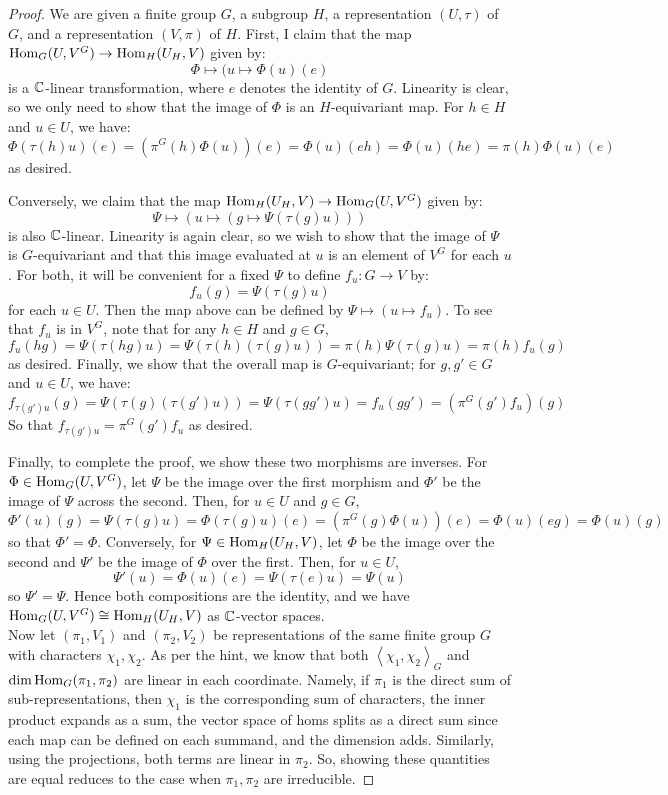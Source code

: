 \begin{proof}
	We are given a finite group $G$, a subgroup $H$, a representation $(U,\tau)$ of $G$, and a representation $(V,\pi)$ of $H$. First, I claim that the map $\operatorname{Hom}_G(U,V^G) \to \operatorname{Hom}_H(U_H,V)$ given by:
	\[ \Phi \mapsto (u \mapsto \Phi(u)(e) \]
	is a $\mathbb{C}$-linear transformation, where $e$ denotes the identity of $G$. Linearity is clear, so we only need to show that the image of $\Phi$ is an $H$-equivariant map. For $h \in H$ and $u \in U$, we have:
	\[ \Phi(\tau(h)u)(e) = (\pi^G(h)\Phi(u))(e) = \Phi(u)(eh) = \Phi(u)(he) = \pi(h)\Phi(u)(e) \]
	as desired.
	
	Conversely, we claim that the map $\operatorname{Hom}_H(U_H,V) \to \operatorname{Hom}_G(U,V^G)$ given by:
	\[ \Psi \mapsto (u \mapsto (g \mapsto \Psi(\tau(g)u))) \]
	is also $\mathbb{C}$-linear. Linearity is again clear, so we wish to show that the image of $\Psi$ is $G$-equivariant and that this image evaluated at $u$ is an element of $V^G$ for each $u$. For both, it will be convenient for a fixed $\Psi$ to define $f_u : G \to V$ by:
	\[ f_u(g) = \Psi(\tau(g)u) \]
	for each $u \in U$. Then the map above can be defined by $\Psi \mapsto (u \mapsto f_u)$. To see that $f_u$ is in $V^G$, note that for any $h \in H$ and $g \in G$,
	\[ f_u(hg) = \Psi(\tau(hg)u) = \Psi(\tau(h)(\tau(g)u)) = \pi(h)\Psi(\tau(g)u) = \pi(h)f_u(g) \]
	as desired. Finally, we show that the overall map is $G$-equivariant; for $g,g' \in G$ and $u \in U$, we have:
	\[ f_{\tau(g')u}(g) = \Psi(\tau(g)(\tau(g')u)) = \Psi(\tau(gg')u) = f_u(gg') = (\pi^G(g')f_u)(g) \]
	So that $f_{\tau(g')u} = \pi^G(g')f_u$ as desired.
	
	Finally, to complete the proof, we show these two morphisms are inverses. For $\Phi \in \operatorname{Hom}_G(U,V^G)$, let $\Psi$ be the image over the first morphism and $\Phi'$ be the image of $\Psi$ across the second. Then, for $u \in U$ and $g \in G$,
	\[ \Phi'(u)(g) = \Psi(\tau(g)u) = \Phi(\tau(g)u)(e) = (\pi^G(g)\Phi(u))(e) = \Phi(u)(eg) = \Phi(u)(g) \]
	so that $\Phi' = \Phi$. Conversely, for $\Psi \in \operatorname{Hom}_H(U_H,V)$, let $\Phi$ be the image over the second and $\Psi'$ be the image of $\Phi$ over the first. Then, for $u \in U$,
	\[ \Psi'(u) = \Phi(u)(e) = \Psi(\tau(e)u) = \Psi(u) \]
	so $\Psi' = \Psi$. Hence both compositions are the identity, and we have $\operatorname{Hom}_G(U,V^G) \cong \operatorname{Hom}_H(U_H,V)$ as $\mathbb{C}$-vector spaces. \\
	
	Now let $(\pi_1,V_1)$ and $(\pi_2,V_2)$ be representations of the same finite group $G$ with characters $\chi_1,\chi_2$. As per the hint, we know that both $\left<\chi_1,\chi_2\right>_G$ and $\dim\operatorname{Hom}_G(\pi_1,\pi_2)$ are linear in each coordinate. Namely, if $\pi_1$ is the direct sum of sub-representations, then $\chi_1$ is the corresponding sum of characters, the inner product expands as a sum, the vector space of homs splits as a direct sum since each map can be defined on each summand, and the dimension adds. Similarly, using the projections, both terms are linear in $\pi_2$. So, showing these quantities are equal reduces to the case when $\pi_1,\pi_2$ are irreducible.
	

\end{proof}
